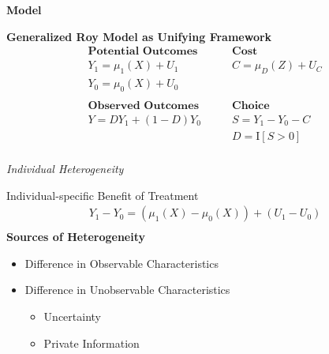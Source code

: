 \begin{frame}\begin{center}
	\LARGE\textbf{Model}
\end{center}\end{frame}
\begin{frame}
	\textbf{Generalized Roy Model as Unifying Framework}
	\begin{align*}
	\textbf{Potential Outcomes} &\qquad \textbf{Cost} \\
	Y_1 = \mu_1(X) + U_1      &\qquad C = \mu_D(Z) + U_C \\
	Y_0 = \mu_0(X) + U_0      &\qquad \\
	& \\
	\textbf{Observed Outcomes} &\qquad \textbf{Choice} \\
	Y = D Y_1 + (1 - D)Y_0 &\qquad S = Y_1 - Y_0 - C \\
	&\qquad D = \mathrm{I}[S > 0] \\
	\end{align*}
\end{frame}
\begin{frame}\begin{center}
		\LARGE\textit{Individual Heterogeneity}
\end{center}\end{frame}
\begin{frame}
	Individual-specific Benefit of Treatment
	\begin{align*}
		Y_1 - Y_0 = (\mu_1(X) - \mu_0(X)) + (U_1 - U_0)\\
	\end{align*}
	\textbf{Sources of Heterogeneity}
	\begin{itemize}\setlength\itemsep{1em}
		\item Difference in Observable Characteristics
		\item Difference in Unobservable Characteristics\medskip
		\begin{itemize}\setlength\itemsep{1em}
			\item  Uncertainty
			\item Private Information
		\end{itemize}
	\end{itemize}
\end{frame}
